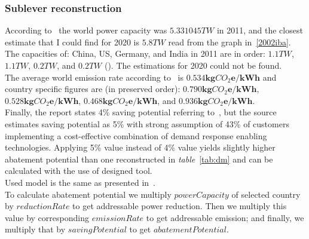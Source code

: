 \documentclass[11pt, twocolumn]{article}
\begin{document}
\subsubsection{Sublever reconstruction\label{sec:dm:reconstruction}}
According to~\citep{eia2011} the world power capacity was $5.331045 TW$ in 2011, and the closest estimate that I could find for 2020 is $5.8 TW$ read from the graph in~\ref{2002iba}. The capacities of: China, US, Germany, and India in 2011 are in order: $1.1 TW$, $1.1 TW$, $0.2 TW$, and $0.2 TW$ (\citep{eia2011}). The estimations for 2020 could not be found.\\
The average world emission rate according to~\citep{iea2012co2} is $\mathbf{0.534 kg}CO_2\mathbf{e}/\mathbf{kWh}$ and country specific figures are (in preserved order): $\mathbf{0.790 kg}CO_2\mathbf{e}/\mathbf{kWh}$, $\mathbf{0.528 kg}CO_2\mathbf{e}/\mathbf{kWh}$, $\mathbf{0.468 kg}CO_2\mathbf{e}/\mathbf{kWh}$, and $\mathbf{0.936 kg}CO_2\mathbf{e}/\mathbf{kWh}$.\\
Finally, the report states 4\% saving potential referring to~\citep{grid2008green}, but the source estimates saving potential as 5\% with strong assumption of 43\% of customers implementing a cost-effective combination of demand response enabling technologies. Applying 5\% value instead of 4\% value yields slightly higher abatement potential than one reconstructed in \emph{table}~\ref{tab:dm} and can be calculated with the use of designed tool.\\

Used model is the same as presented in~\citep{grid2008green}.\\
To calculate abatement potential we multiply $powerCapacity$ of selected country by $reductionRate$ to get addressable power reduction. Then we multiply this value by corresponding $emissionRate$ to get addressable emission; and finally, we multiply that by $savingPotential$ to get $abatementPotential$.\\
\end{document}
